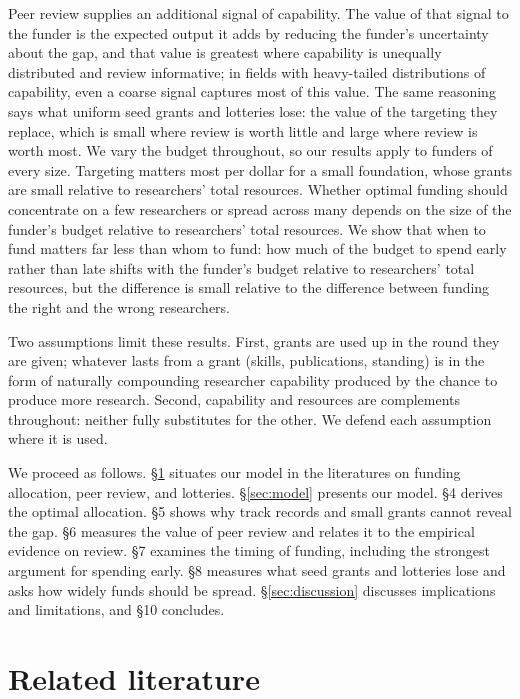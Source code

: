 \documentclass[article, 11pt, reqno]{amsart}
\theoremstyle{named}
\begin{document}
Peer review supplies an additional signal of capability. The value of that signal to the funder is the expected output it adds by reducing the funder's uncertainty about the gap, and that value is greatest where capability is unequally distributed and review informative; in fields with heavy-tailed distributions of capability, even a coarse signal captures most of this value. The same reasoning says what uniform seed grants and lotteries lose: the value of the targeting they replace, which is small where review is worth little and large where review is worth most. We vary the budget throughout, so our results apply to funders of every size. Targeting matters most per dollar for a small foundation, whose grants are small relative to researchers' total resources. Whether optimal funding should concentrate on a few researchers or spread across many depends on the size of the funder's budget relative to researchers' total resources. We show that when to fund matters far less than whom to fund: how much of the budget to spend early rather than late shifts with the funder's budget relative to researchers' total resources, but the difference is small relative to the difference between funding the right and the wrong researchers.

Two assumptions limit these results. First, grants are used up in the round they are given; whatever lasts from a grant (skills, publications, standing) is in the form of naturally compounding researcher capability produced by the chance to produce more research. Second, capability and resources are complements throughout: neither fully substitutes for the other. We defend each assumption where it is used.

We proceed as follows. \S\ref{sec:literature} situates our model in the literatures on funding allocation, peer review, and lotteries. \S\ref{sec:model} presents our model. \S4 derives the optimal allocation. \S5 shows why track records and small grants cannot reveal the gap. \S6 measures the value of peer review and relates it to the empirical evidence on review. \S7 examines the timing of funding, including the strongest argument for spending early. \S8 measures what seed grants and lotteries lose and asks how widely funds should be spread. \S\ref{sec:discussion} discusses implications and limitations, and \S10 concludes.

\section{Related literature}\label{sec:literature}
\end{document}
